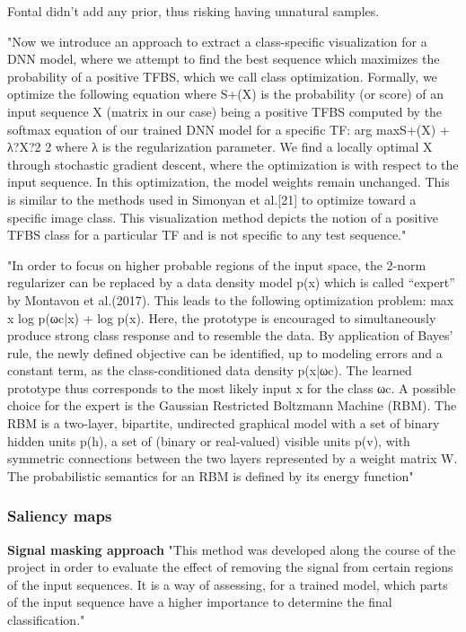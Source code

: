 		Fontal didn't add any prior, thus risking having unnatural samples.
	
		"Now we introduce an approach to extract a class-specific visualization for a DNN model, where we attempt to find the best sequence which maximizes the probability of a positive TFBS, which we call class optimization. Formally, we optimize the following equation where S+(X) is the probability (or score) of an input sequence X (matrix in our case) being a positive TFBS computed by the softmax equation of our trained DNN model for a specific TF:
		arg maxS+(X) + λ?X?2 2
		where λ is the regularization parameter. We find a locally optimal X through stochastic gradient descent, where the optimization is with respect to the input sequence. In this optimization, the model weights remain unchanged. This is similar to the methods used in Simonyan et al.[21] to optimize toward a specific image class. This visualization method depicts the notion of a positive TFBS class for a particular TF and is not specific to any test sequence." \cite{Lanchantin2016}
		
	
		"In order to focus on higher probable regions of the input space, the 2-norm regularizer can be replaced by a data density model p(x) which is called “expert” by Montavon et al.(2017). This leads to the following optimization problem:
		max x log p(ωc|x) + log p(x).
		Here, the prototype is encouraged to simultaneously produce strong class response and to  resemble  the  data.   By  application  of  Bayes’  rule,  the  newly  defined  objective  can  be identified, up to modeling errors and a constant term, as the class-conditioned data density p(x|ωc).  The learned prototype thus corresponds to the most likely input x for the class ωc.  A possible choice for the expert is the Gaussian Restricted Boltzmann Machine (RBM).
		The RBM is a two-layer, bipartite, undirected graphical model with a set of binary hidden units p(h), a set of (binary or real-valued) visible units p(v), with symmetric connections between the two layers represented by a weight matrix W.  The probabilistic semantics for an RBM is defined by its energy function" \cite{Montavon2018}
		
		
	
		\subsubsection{Saliency maps}
		\textbf{Signal masking approach}
		"This method was developed along the course of the project in order to evaluate the effect of removing the signal from certain regions of the input sequences. It is a way of assessing, for a trained model, which parts of the input sequence have a higher importance to determine the final classification." \cite{Fontal2017}
		
